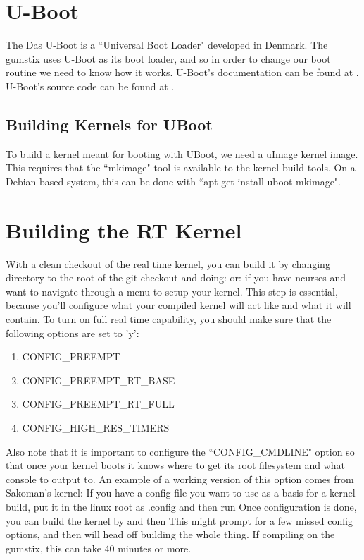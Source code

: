 \section{U-Boot}
The Das U-Boot is a ``Universal Boot Loader" \cite{UBoot} developed in Denmark.  The gumstix uses U-Boot as its boot loader, and so in order to change our boot routine we need to know how it works.  U-Boot's documentation can be found at \cite{UBootDocs}. U-Boot's source code can be found at \cite{UBootSource}.
\subsection{Building Kernels for UBoot}
To build a kernel meant for booting with UBoot, we need a uImage kernel image.  This requires that the ``mkimage" tool is available to the kernel build tools.  On a Debian based system, this can be done with ``apt-get install uboot-mkimage".
\section{Building the RT Kernel}
With a clean checkout of the real time kernel, you can build it by changing directory to the root of the git checkout and doing:  or:  if you have ncurses and want to navigate through a menu to setup your kernel.  This step is essential, because you'll configure what your compiled kernel will act like and what it will contain.  To turn on full real time capability, you should make sure that the following options are set to 'y':
\begin{enumerate}
\item CONFIG\_PREEMPT
\item CONFIG\_PREEMPT\_RT\_BASE
\item CONFIG\_PREEMPT\_RT\_FULL
\item CONFIG\_HIGH\_RES\_TIMERS
\end{enumerate}

Also note that it is important to configure the ``CONFIG\_CMDLINE" option so that once your kernel boots it knows where to get its root filesystem and what console to output to.  An example of a working version of this option comes from Sakoman's kernel:
If you have a config file you want to use as a basis for a kernel build, put it in the linux root as .config and then run 
Once configuration is done, you can build the kernel by  and then   This might prompt for a few missed config options, and then will head off building the whole thing.  If compiling on the gumstix, this can take 40 minutes or more.


